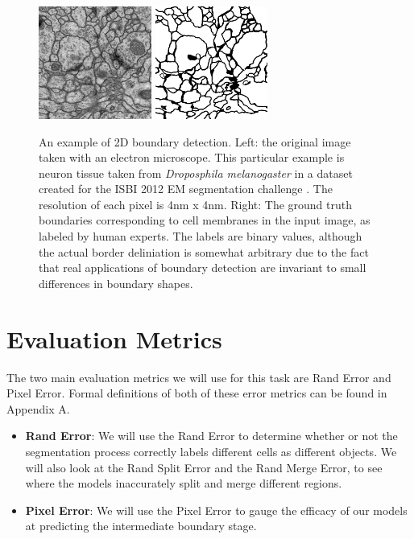\begin{figure}
    \centering
	\includegraphics[width=0.33\textwidth]{img/isbi_raw_example}
	\hspace{1cm}
	\includegraphics[width=0.33\textwidth]{img/isbi_label_example}
    \caption[An example of 2D boundary detection]{An example of 2D boundary detection. Left: the original image taken with an electron microscope. This particular example is neuron tissue taken from \textit{Droposphila melanogaster} in a dataset created for the ISBI 2012 EM segmentation challenge \cite{Arganda-Carreras2015}. The resolution of each pixel is 4nm x 4nm. Right: The ground truth boundaries corresponding to cell membranes in the input image, as labeled by human experts. The labels are binary values, although the actual border deliniation is somewhat arbitrary due to the fact that real applications of boundary detection are invariant to small differences in boundary shapes.}
    \label{fig:isbi_example}
\end{figure}

\section{Evaluation Metrics}

The two main evaluation metrics we will use for this task are Rand Error and Pixel Error. Formal definitions of both of these error metrics can be found in Appendix A. 

\begin{itemize}
\item \textbf{Rand Error}: We will use the Rand Error to determine whether or not the segmentation process correctly labels different cells as different objects. We will also look at the Rand Split Error and the Rand Merge Error, to see where the models inaccurately split and merge different regions.
\item \textbf{Pixel Error}: We will use the Pixel Error to gauge the efficacy of our models at predicting the intermediate boundary stage.
\end{itemize}

